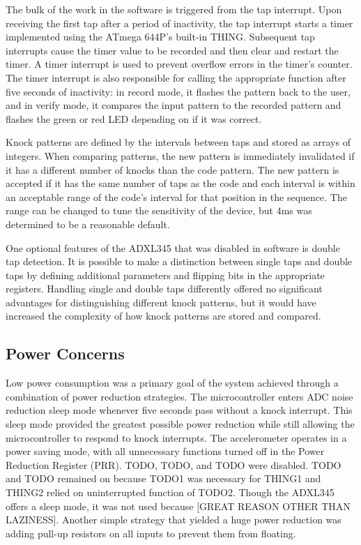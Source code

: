 \documentclass[conference]{./IEEEtran}
\begin{document}
The bulk of the work in the software is triggered from the tap interrupt. Upon receiving the first tap after a period of inactivity, the tap interrupt starts a timer implemented using the ATmega 644P's built-in THING. Subsequent tap interrupts cause the timer value to be recorded and then clear and restart the timer. A timer interrupt is used to prevent overflow errors in the timer's counter. The timer interrupt is also responsible for calling the appropriate function after five seconds of inactivity: in record mode, it flashes the pattern back to the user, and in verify mode, it compares the input pattern to the recorded pattern and flashes the green or red LED depending on if it was correct. 

Knock patterns are defined by the intervals between taps and stored as arrays of integers. When comparing patterns, the new pattern is immediately invalidated if it has a different number of knocks than the code pattern. The new pattern is accepted if it has the same number of taps as the code and each interval is within an acceptable range of the code's interval for that position in the sequence. The range can be changed to tune the sensitivity of the device, but 4ms was determined to be a reasonable default.

One optional features of the ADXL345 that was disabled in software is double tap detection. It is possible to make a distinction between single taps and double taps by defining additional parameters and flipping bits in the appropriate registers. Handling single and double taps differently offered no significant advantages for distinguishing different knock patterns, but it would have increased the complexity of how knock patterns are stored and compared. 


\subsection{Power Concerns}
Low power consumption was a primary goal of the system achieved through a combination of power reduction strategies. The microcontroller enters ADC noise reduction sleep mode whenever five seconds pass without a knock interrupt. This sleep mode provided the greatest possible power reduction while still allowing the microcontroller to respond to knock interrupts. The accelerometer operates in a power saving mode, with all unnecessary functions turned off in the Power Reduction Register (PRR). TODO, TODO, and TODO were disabled. TODO and TODO remained on because TODO1 was necessary for THING1 and THING2 relied on uninterrupted function of TODO2.  Though the ADXL345 offers a sleep mode, it was not used because [GREAT REASON OTHER THAN LAZINESS]. Another simple strategy that yielded a huge power reduction was adding pull-up resistors on all inputs to prevent them from floating.
\end{document}
